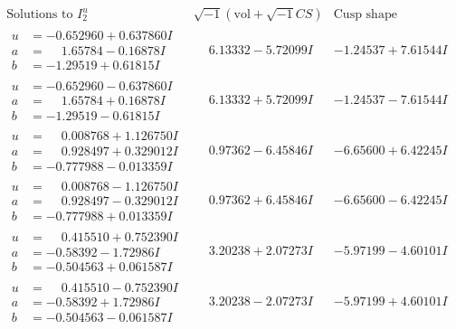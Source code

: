 \documentclass[1p]{elsarticle_modified}
\theoremstyle{definition}
\newcommand{\I}{\sqrt{-1}}
\begin{document}
$$\begin{array}{c|c|c}  
\text{Solutions to }I^u_{2}& \I (\text{vol} + \sqrt{-1}CS) & \text{Cusp shape}\\
 \hline 
\begin{aligned}
u &= -0.652960 + 0.637860 I \\
a &= \phantom{-}1.65784 - 0.16878 I \\
b &= -1.29519 + 0.61815 I\end{aligned}
 & \phantom{-}6.13332 - 5.72099 I & -1.24537 + 7.61544 I \\ \hline\begin{aligned}
u &= -0.652960 - 0.637860 I \\
a &= \phantom{-}1.65784 + 0.16878 I \\
b &= -1.29519 - 0.61815 I\end{aligned}
 & \phantom{-}6.13332 + 5.72099 I & -1.24537 - 7.61544 I \\ \hline\begin{aligned}
u &= \phantom{-}0.008768 + 1.126750 I \\
a &= \phantom{-}0.928497 + 0.329012 I \\
b &= -0.777988 - 0.013359 I\end{aligned}
 & \phantom{-}0.97362 - 6.45846 I & -6.65600 + 6.42245 I \\ \hline\begin{aligned}
u &= \phantom{-}0.008768 - 1.126750 I \\
a &= \phantom{-}0.928497 - 0.329012 I \\
b &= -0.777988 + 0.013359 I\end{aligned}
 & \phantom{-}0.97362 + 6.45846 I & -6.65600 - 6.42245 I \\ \hline\begin{aligned}
u &= \phantom{-}0.415510 + 0.752390 I \\
a &= -0.58392 - 1.72986 I \\
b &= -0.504563 + 0.061587 I\end{aligned}
 & \phantom{-}3.20238 + 2.07273 I & -5.97199 - 4.60101 I \\ \hline\begin{aligned}
u &= \phantom{-}0.415510 - 0.752390 I \\
a &= -0.58392 + 1.72986 I \\
b &= -0.504563 - 0.061587 I\end{aligned}
 & \phantom{-}3.20238 - 2.07273 I & -5.97199 + 4.60101 I \\ \hline\begin{aligned}

\end{aligned}
\end{array}$$
\end{document}
